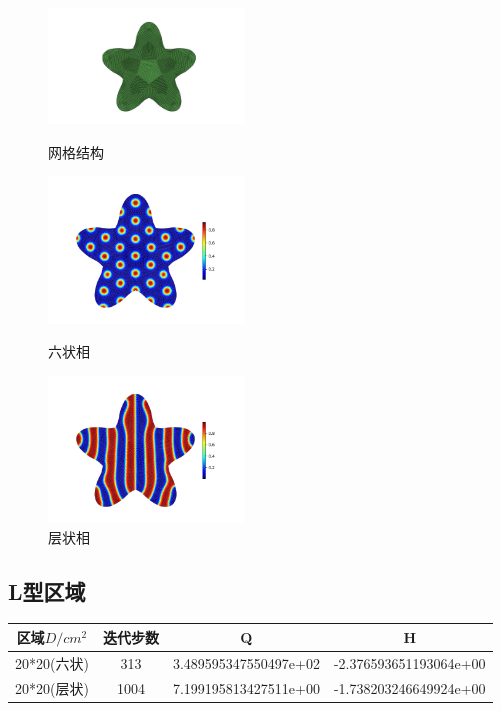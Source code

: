 \documentclass[12pt]{article}
\begin{document}
\begin{CJK}{UTF8}{gkai}
\begin{figure}[H]
	\setlength{\abovecaptionskip}{0.cm}
	\setlength{\belowcaptionskip}{-0.cm}
	\begin{minipage}[!htbp]{0.3\linewidth}
		\includegraphics[width=5.2cm]{Figure_huaban.png}
		\caption*{网格结构}
	\end{minipage}
	\hspace{0.23in}
	\begin{minipage}[!htbp]{0.3\linewidth}
		\includegraphics[width=5.2cm]{scftfigure626.png}
		\caption*{六状相}
	\end{minipage}
	\hspace{0.23in}
	\begin{minipage}[!htbp]{0.3\linewidth}
		\includegraphics[width=5.2cm]{scftfigure1394.png}
		\caption*{层状相}
	\end{minipage}
\end{figure} 

\subsection{L型区域}   
\begin{table}[H]
	\centering
	\begin{tabular}{cccc}
		\toprule
		区域$D/cm^2$ &	迭代步数 & Q &  H \\
		\midrule
		20*20(六状)&313 &3.489595347550497e+02 &-2.376593651193064e+00\\
		20*20(层状)&1004 &7.199195813427511e+00 &-1.738203246649924e+00\\
		\bottomrule
	\end{tabular}
\end{table}


\end{CJK}
\end{document}
